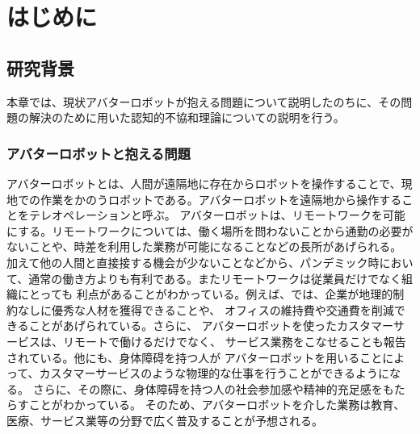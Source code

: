 \documentclass[11pt,a4j]{jreport}
\begin{document}

\tableofcontents


\pagestyle{fancy}
\lhead{\rightmark}
\renewcommand{\chaptermark}[1]{\markboth{第\ \normalfont\thechapter\ 章~~#1}{}}

\chapter{はじめに} %

\section{研究背景} %
本章では、現状アバターロボットが抱える問題について説明したのちに、その問題の解決のために用いた認知的不協和理論についての説明を行う。
\subsection{アバターロボットと抱える問題} %
アバターロボットとは、人間が遠隔地に存在からロボットを操作することで、現地での作業をかのうロボットである。アバターロボットを遠隔地から操作することをテレオペレーションと呼ぶ。
アバターロボットは、リモートワークを可能にする。リモートワークについては、働く場所を問わないことから通勤の必要がないことや、時差を利用した業務が可能になることなどの長所があげられる。
加えて他の人間と直接接する機会が少ないことなどから、パンデミック時において、通常の働き方よりも有利である。またリモートワークは従業員だけでなく組織にとっても
利点があることがわかっている。例えば、\cite{FERREIRA202170}では、企業が地理的制約なしに優秀な人材を獲得できることや、
オフィスの維持費や交通費を削減できることがあげられている。さらに、
アバターロボットを使ったカスタマーサービスは、リモートで働けるだけでなく、
サービス業務をこなせることも報告されている\cite{Kanda2010}。他にも、身体障碍を持つ人が
アバターロボットを用いることによって、カスタマーサービスのような物理的な仕事を行うことができるようになる。
さらに、その際に、身体障碍を持つ人の社会参加感や精神的充足感をもたらすことがわかっている\cite{takeuchi2020avatar}。
そのため、アバターロボットを介した業務は教育、医療、サービス業等の分野で広く普及することが予想される。
\end{document}

